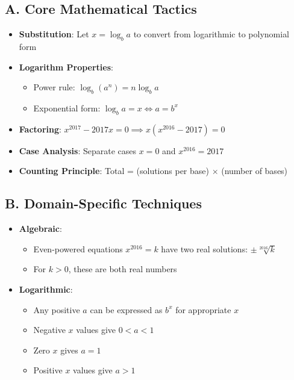 \documentclass[]{article}
\begin{document}
\begin{tacticalbox}
\subsection*{A. Core Mathematical Tactics}
\begin{itemize}[leftmargin=*]
    \item \textbf{Substitution}: Let $x = \log_b a$ to convert from logarithmic to polynomial form
    
    \item \textbf{Logarithm Properties}: 
    \begin{itemize}
        \item Power rule: $\log_b(a^n) = n\log_b a$
        \item Exponential form: $\log_b a = x \iff a = b^x$
    \end{itemize}
    
    \item \textbf{Factoring}: $x^{2017} - 2017x = 0 \implies x(x^{2016} - 2017) = 0$
    
    \item \textbf{Case Analysis}: Separate cases $x=0$ and $x^{2016} = 2017$
    
    \item \textbf{Counting Principle}: Total = (solutions per base) $\times$ (number of bases)
\end{itemize}

\subsection*{B. Domain-Specific Techniques}
\begin{itemize}[leftmargin=*]
    \item \textbf{Algebraic}: 
    \begin{itemize}
        \item Even-powered equations $x^{2016} = k$ have two real solutions: $\pm\sqrt[2016]{k}$
        \item For $k > 0$, these are both real numbers
    \end{itemize}
    
    \item \textbf{Logarithmic}:
    \begin{itemize}
        \item Any positive $a$ can be expressed as $b^x$ for appropriate $x$
        \item Negative $x$ values give $0 < a < 1$
        \item Zero $x$ gives $a = 1$
        \item Positive $x$ values give $a > 1$
    \end{itemize}
\end{itemize}


\end{tacticalbox}
\end{document}
